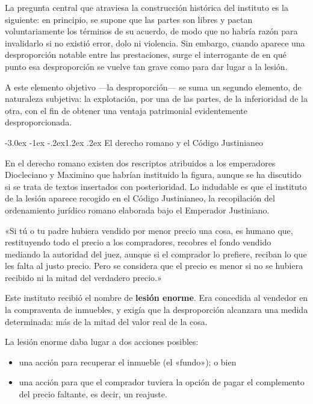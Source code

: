 \documentclass[12pt,oneside]{book}
\makeatletter
\renewcommand\section{\@startsection{section}{1}{\z@}%
  {-3.0ex \@plus -1ex \@minus -.2ex}{1.2ex \@plus .2ex}%
  {\normalfont\large\bfseries\color{acento}}}
\makeatother
\begin{document}
La pregunta central que atraviesa la construcción histórica del instituto es la siguiente: en principio, se supone que las partes son libres y pactan voluntariamente los términos de su acuerdo, de modo que no habría razón para invalidarlo si no existió error, dolo ni violencia. Sin embargo, cuando aparece una desproporción notable entre las prestaciones, surge el interrogante de en qué punto esa desproporción se vuelve tan grave como para dar lugar a la lesión.

A este elemento objetivo ---la desproporción--- se suma un segundo elemento, de naturaleza subjetiva: la explotación, por una de las partes, de la inferioridad de la otra, con el fin de obtener una ventaja patrimonial evidentemente desproporcionada.

\section{El derecho romano y el Código Justinianeo}

En el derecho romano existen dos rescriptos atribuidos a los emperadores Diocleciano y Maximino que habrían instituido la figura, aunque se ha discutido si se trata de textos insertados con posterioridad. Lo indudable es que el instituto de la lesión aparece recogido en el Código Justinianeo, la recopilación del ordenamiento jurídico romano elaborada bajo el Emperador Justiniano.

\begin{regla}
«Si tú o tu padre hubiera vendido por menor precio una cosa, es humano que, restituyendo todo el precio a los compradores, recobres el fondo vendido mediando la autoridad del juez, aunque si el comprador lo prefiere, reciban lo que les falta al justo precio. Pero se considera que el precio es menor si no se hubiera recibido ni la mitad del verdadero precio.»
\end{regla}

Este instituto recibió el nombre de \textbf{lesión enorme}. Era concedida al vendedor en la compraventa de inmuebles, y exigía que la desproporción alcanzara una medida determinada: más de la mitad del valor real de la cosa.

La lesión enorme daba lugar a dos acciones posibles:

\begin{itemize}
    \item una acción para recuperar el inmueble (el «fundo»); o bien
    \item una acción para que el comprador tuviera la opción de pagar el complemento del precio faltante, es decir, un reajuste.
\end{itemize}
\end{document}
